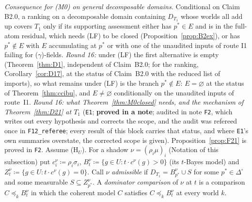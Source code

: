 \documentclass[11pt]{article}
\theoremstyle{definition}
\theoremstyle{remark}
\newcommand{\Di}{\Delta^{\circ}}
\newcommand{\src}[1]{\texttt{#1}}
\begin{document}
\emph{Consequence for (M0) on general decomposable domains.} Conditional on Claim B2.0, a ranking on a decomposable domain containing $D_{T_1}$ whose worlds all add up covers $T_1$ only if its supporting assessment either has $p^*\in E$ and is in the full-atom residual, which needs (LF) to be closed (Proposition~\ref{prop:B2ex}), or has $p^*\notin E$ with $E$ accumulating at $p^*$ or with one of the unaudited inputs of route I1 failing for ($\gamma$)-fields. \emph{Round 16:} under (LF) the first alternative is empty (Theorem~\ref{thm:D1}, independent of Claim~B2.0; for the ranking, Corollary~\ref{cor:D17}, at the status of Claim~B2.0 with the reduced list of imports), so what remains under (LF) is the branch $p^*\notin E$: $E=\varnothing$ at the status of Theorem~\ref{thm:ccibu}, and $E\ne\varnothing$ conditionally on the unaudited inputs of route~I1.
\emph{Round 16: what Theorem~\ref{thm:M0closed} needs, and the mechanism of Theorem~\ref{thm:D21} at $T_1$} (\src{E1}; \textbf{proved in a note}; audited in note \src{F2}, which writes out every hypothesis and corrects the scope, and the audit was refereed once in \src{F12\_referee}; every result of this block carries that status, and where \src{E1}'s own summaries overstate, the corrected scope is given). Proposition~\ref{prop:F21} is proved in \src{F2}. Assume (H$_U$). For a shadow $\nu=(\rho_i\mu)_i$ (Notation of this subsection) put $c^\nu_i\coloneqq\rho_i\sigma_i$, $B^\nu_t\coloneqq\{g\in U:t\cdot c^\nu(g)>0\}$ (its $t$-Bayes model) and $Z^\nu_t\coloneqq\{g\in U:t\cdot c^\nu(g)=0\}$. Call $\nu$ \emph{admissible} if $D_{T_1}=B^\nu_{p^*}\cup S$ for some $p^*\in\Di$ and some measurable $S\subseteq Z^\nu_{p^*}$. A \emph{dominator comparison} of $\nu$ at $t$ is a comparison $C\preceq_kB^\nu_t$ in which the coherent model $C$ satisfies $C\preceq_kB^\nu_t$ at every world $k$.
\end{document}

